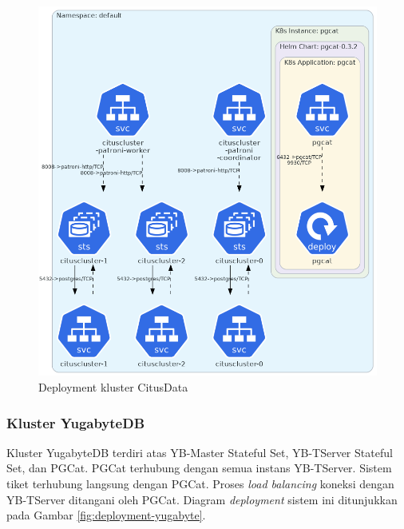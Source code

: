 \begin{figure}[htbp]
    \centering
    \includegraphics[width=1\textwidth]{resources/chapter-4/citusdata.png}
    \caption{Deployment kluster CitusData}
    \label{fig:deployment-citusdata}
\end{figure}

\pagebreak

\subsubsection{Kluster YugabyteDB}

Kluster YugabyteDB terdiri atas YB-Master Stateful Set, YB-TServer Stateful Set, dan PGCat. PGCat terhubung dengan semua instans YB-TServer. Sistem tiket terhubung langsung dengan PGCat. Proses \textit{load balancing} koneksi dengan YB-TServer ditangani oleh PGCat. Diagram \textit{deployment} sistem ini ditunjukkan pada Gambar \ref{fig:deployment-yugabyte}.

